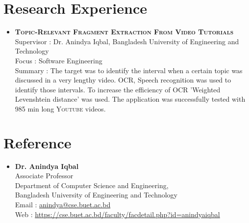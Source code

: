 \documentclass[a4paper,10pt]{article}
\begin{document}
\section{Research Experience}
\begin{itemize}
    \item \textbf{\textsc{Topic-Relevant Fragment Extraction From Video Tutorials}} \\
    Supervisor : Dr. Anindya Iqbal, Bangladesh University of Engineering and Technology \\
    Focus : Software Engineering \\
    Summary : The target was to identify the interval when a certain topic was discussed in a very lengthy video. OCR, Speech recognition was used to identify those intervals. To increase the efficiency of OCR 'Weighted Levenshtein distance' was used. The application was successfully tested with 985 min long \textsc{Youtube} videos.
\end{itemize}


\section{Reference}
\begin{itemize}
    \item \textbf{Dr. Anindya Iqbal} \\
    Associate Professor \\
    Department of Computer Science and Engineering, \\
    Bangladesh University of Engineering and Technology \\
    Email : \href{mailto:anindya@cse.buet.ac.bd}{anindya@cse.buet.ac.bd} \\ 
    Web : \href{https://cse.buet.ac.bd/faculty/facdetail.php?id=anindyaiqbal}{https://cse.buet.ac.bd/faculty/facdetail.php?id=anindyaiqbal}
\end{itemize}


\end{document}
